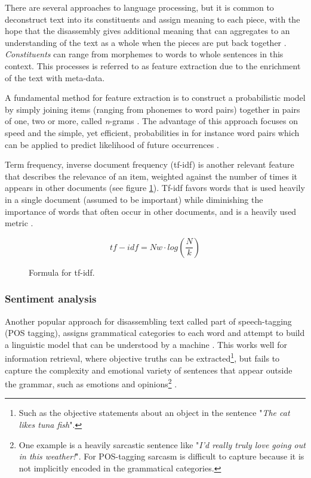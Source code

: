 \documentclass[a4paper]{article}
\begin{document}
There are several approaches to language processing, but it is common
to deconstruct text into its constituents and assign meaning
to each piece, with the hope that the disassembly gives additional meaning
that can aggregates to an understanding of the text as a whole when the pieces
are put back together \citep{Jurafsky2000}.
\textit{Constituents} can range from morphemes to words to whole sentences in
this context. This processes is referred to as feature extraction due to the
enrichment of the text with meta-data.

A fundamental method for feature extraction is to construct a probabilistic
model by simply joining items (ranging from phonemes to word pairs) together
in pairs of one, two or more, called \textit{n}-grams \citep{Jurafsky2000}.
The advantage of this approach focuses on speed and the simple, yet efficient,
probabilities in for instance word pairs which can be applied to predict
likelihood of future occurrences \citep{Jurafsky2000}.

Term frequency, inverse document frequency (tf-idf) is another relevant feature
that describes the relevance of an item, weighted against the number of
times it appears in other documents \citep{Jurafsky2000} (see figure \ref{fig:tfidf}).
Tf-idf favors words that is used heavily in a
single document (assumed to be important) while diminishing the importance of
words that often occur in other documents, and is a heavily used metric \citep{Jurafsky2000}.

\begin{figure}
\[tf-idf = Nw \cdot log(\frac{N}{k})\]
\caption{Formula for tf-idf.}
\label{fig:tfidf}
\end{figure}

\subsubsection{Sentiment analysis}
Another popular approach for disassembling text
called part of speech-tagging (POS tagging), assigns grammatical categories
to each word and attempt to build a linguistic model that can be understood by
a machine \citep{Jurafsky2000}. This works well for information retrieval,
where objective truths can be extracted\footnote{Such as the objective statements about an object in the
sentence "\textit{The cat likes tuna fish}".}, but fails
to capture the complexity and emotional variety of sentences that appear
outside the grammar, such as emotions and opinions\footnote{One example is a heavily sarcastic sentence like
"\textit{I'd really truly love going out in this weather!}". For POS-tagging
sarcasm is difficult to capture because it is not implicitly encoded in the
grammatical categories.} \citep{Jurafsky2000}.
\label{text:irony}
\end{document}
